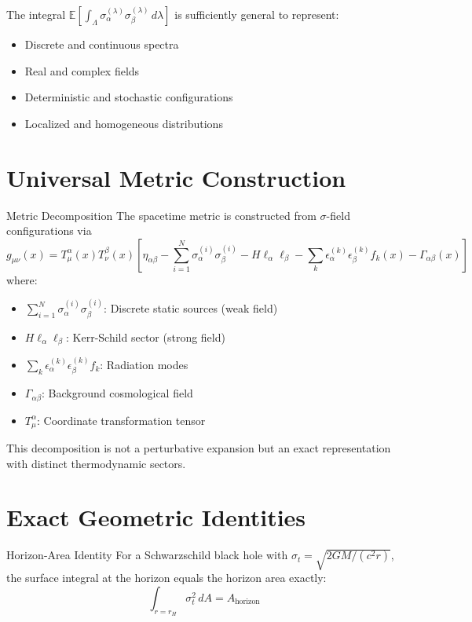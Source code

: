 \documentclass[11pt,a4paper]{article}
\theoremstyle{definition}
\theoremstyle{remark}
\begin{document}
	The integral $\mathbb{E}[\int_\Lambda \sigma_\alpha^{(\lambda)} \sigma_\beta^{(\lambda)} \, d\lambda]$ is sufficiently general to represent:
	\begin{itemize}
		\item Discrete and continuous spectra
		\item Real and complex fields
		\item Deterministic and stochastic configurations
		\item Localized and homogeneous distributions
	\end{itemize}

	\section{Universal Metric Construction}
	
	Metric Decomposition
		The spacetime metric is constructed from $\sigma$-field configurations via
		\begin{equation}
			g_{\mu\nu}(x) = T^\alpha_\mu(x) T^\beta_\nu(x) \left[\eta_{\alpha\beta} - \sum_{i=1}^N \sigma_\alpha^{(i)} \sigma_\beta^{(i)} - H \ell_\alpha \ell_\beta - \sum_k \epsilon_\alpha^{(k)} \epsilon_\beta^{(k)} f_k(x) - \Gamma_{\alpha\beta}(x)\right]
		\end{equation}
		where:
		\begin{itemize}
			\item $\sum_{i=1}^N \sigma^{(i)}_\alpha \sigma^{(i)}_\beta$: Discrete static sources (weak field)
			\item $H\ell_\alpha \ell_\beta$: Kerr-Schild sector (strong field)
			\item $\sum_k \epsilon^{(k)}_\alpha \epsilon^{(k)}_\beta f_k$: Radiation modes
			\item $\Gamma_{\alpha\beta}$: Background cosmological field
			\item $T^\alpha_\mu$: Coordinate transformation tensor
		\end{itemize}
	
	This decomposition is not a perturbative expansion but an exact representation with distinct thermodynamic sectors.
	
	\section{Exact Geometric Identities}
	
	Horizon-Area Identity
		For a Schwarzschild black hole with $\sigma_t = \sqrt{2GM/(c^2r)}$, the surface integral at the horizon equals the horizon area exactly:
		\begin{equation}
			\int_{r=r_H} \sigma_t^2 \, dA = A_{\text{horizon}}
		\end{equation}
	
\end{document}
